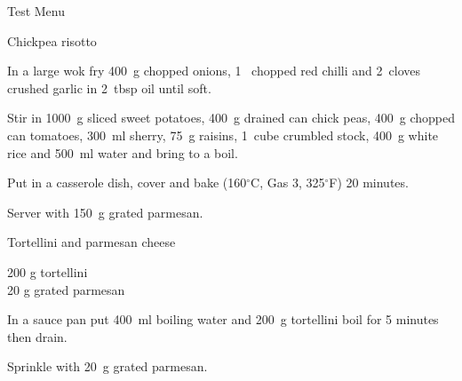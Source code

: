 \begin{menu}{Test Menu}
\begin{recipe}{2}{Chickpea risotto}
    \begin{instructions}
    \item 
        In a large wok fry
        400~g chopped onions,
        1~ chopped red chilli
        and
        2~cloves crushed garlic
        in
        2~tbsp  oil
        until soft.
      \item 
        Stir in
        1000~g sliced sweet potatoes,
        400~g drained can chick peas,
        400~g chopped can tomatoes,
        300~ml  sherry,
        75~g  raisins,
        1~cube crumbled stock,
        400~g  white rice
        and
        500~ml  water
        and bring to a boil.
      \item 
        Put in a
        casserole dish,
        cover and bake 
      (160$^{\circ}$C, Gas 3, 325$^{\circ}$F)
     20 minutes.
      \item 
        Server with
        150~g grated parmesan.
      
    \end{instructions}
    \end{recipe}%
  
    \begin{recipe}{1}{Tortellini and parmesan cheese}%
    
		\begin{ingredients}
		200 g tortellini  \\
	20 g grated parmesan  \\
	
		\end{ingredients}
	
    \begin{instructions}
    \item 
      In a
      sauce pan
      put
      400~ml  boiling water
      and
      200~g  tortellini
      boil for 5 minutes then drain.
    \item 
        Sprinkle with
        20~g  grated parmesan.
      
    \end{instructions}
    \end{recipe}%
  
    \clearpage
    \end{menu}
	
